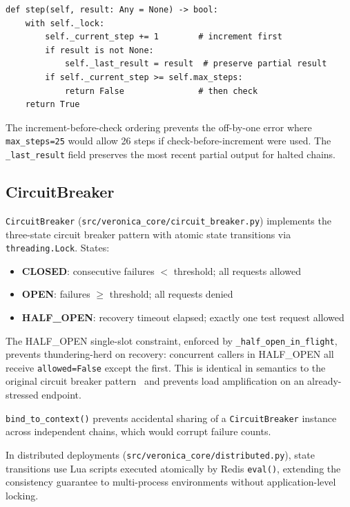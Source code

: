 \documentclass[11pt]{article}
\begin{document}
\begin{lstlisting}
def step(self, result: Any = None) -> bool:
    with self._lock:
        self._current_step += 1        # increment first
        if result is not None:
            self._last_result = result  # preserve partial result
        if self._current_step >= self.max_steps:
            return False               # then check
    return True
\end{lstlisting}

The increment-before-check ordering prevents the off-by-one error where
\texttt{max\_steps=25} would allow 26 steps if check-before-increment were
used. The \texttt{\_last\_result} field preserves the most recent partial
output for halted chains.

\subsection{CircuitBreaker}

\texttt{CircuitBreaker} (\texttt{src/veronica\_core/circuit\_breaker.py})
implements the three-state circuit breaker pattern with atomic state
transitions via \texttt{threading.Lock}. States:

\begin{itemize}[nosep]
  \item \textbf{CLOSED}: consecutive failures $<$ threshold; all requests
    allowed
  \item \textbf{OPEN}: failures $\geq$ threshold; all requests denied
  \item \textbf{HALF\_OPEN}: recovery timeout elapsed; exactly one test request
    allowed
\end{itemize}

The HALF\_OPEN single-slot constraint, enforced by
\texttt{\_half\_open\_in\_flight}, prevents thundering-herd on recovery:
concurrent callers in HALF\_OPEN all receive \texttt{allowed=False} except the
first. This is identical in semantics to the original circuit breaker
pattern~\cite{nygard2007releaseit} and prevents load amplification on an
already-stressed endpoint.

\texttt{bind\_to\_context()} prevents accidental sharing of a
\texttt{CircuitBreaker} instance across independent chains, which would
corrupt failure counts.

In distributed deployments (\texttt{src/veronica\_core/distributed.py}), state
transitions use Lua scripts executed atomically by Redis \texttt{eval()},
extending the consistency guarantee to multi-process environments without
application-level locking.
\end{document}

